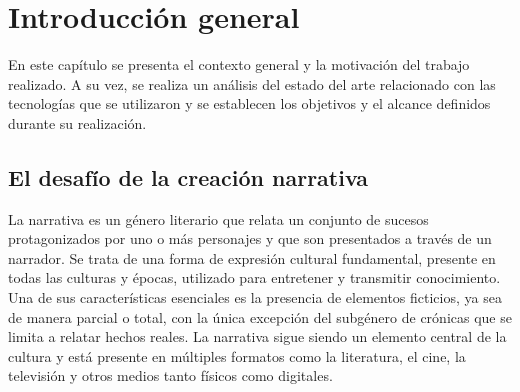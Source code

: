 
\chapter{Introducción general} %

\label{Chapter1} %
\label{IntroGeneral}

En este capítulo se presenta el contexto general y la motivación del trabajo realizado.
A su vez, se realiza un análisis del estado del arte relacionado con las tecnologías que se utilizaron
y se establecen los objetivos y el alcance definidos durante su realización.

\newcommand{\keyword}[1]{\textbf{#1}}
\newcommand{\tabhead}[1]{\textbf{#1}}
\newcommand{\code}[1]{\texttt{#1}}
\newcommand{\file}[1]{\texttt{\bfseries#1}}
\newcommand{\option}[1]{\texttt{\itshape#1}}
\newcommand{\grados}{$^{\circ}$}



\section{El desafío de la creación narrativa}

La narrativa \cite{narrative_def} es un género literario que relata un conjunto de sucesos
protagonizados por uno o más personajes y que son presentados a través de un narrador.
Se trata de una forma de expresión cultural fundamental, presente en todas las culturas y épocas,
utilizado para entretener y transmitir conocimiento.
Una de sus características esenciales es la presencia de elementos ficticios, ya sea de manera parcial o total,
con la única excepción del subgénero de crónicas que se limita a relatar hechos reales.
La narrativa sigue siendo un elemento central de la cultura y está
presente en múltiples formatos como la literatura, el cine, la televisión y otros medios tanto físicos como digitales.

